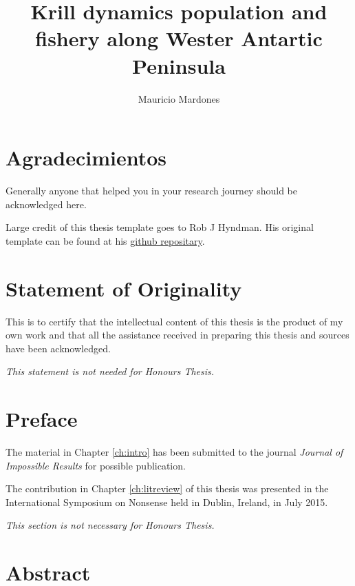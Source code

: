 \documentclass{sydneythesis}
\author{Mauricio Mardones}
\title{Krill dynamics population and fishery along Wester Antartic Peninsula}
\begin{document}

\titlepage

{\sf\tighttoc\doublespacing}

\hypertarget{agradecimientos}{%
\chapter*{Agradecimientos}\label{agradecimientos}}

Generally anyone that helped you in your research journey should be acknowledged here.

Large credit of this thesis template goes to Rob J Hyndman. His original template can be found at his \href{https://github.com/robjhyndman/MonashThesis}{github repositary}.

\hypertarget{statement-of-originality}{%
\chapter*{Statement of Originality}\label{statement-of-originality}}

This is to certify that the intellectual content of this thesis is the product of my own work and that all the assistance received in preparing this thesis and sources have been acknowledged.

\emph{This statement is not needed for Honours Thesis.}

\vspace*{2cm}\par\authorname

\hypertarget{preface}{%
\chapter*{Preface}\label{preface}}

The material in Chapter \ref{ch:intro} has been submitted to the journal \emph{Journal of Impossible Results} for possible publication.

The contribution in Chapter \ref{ch:litreview} of this thesis was presented in the International Symposium on Nonsense held in Dublin, Ireland, in July 2015.

\emph{This section is not necessary for Honours Thesis.}

\hypertarget{abstract}{%
\chapter*{Abstract}\label{abstract}}
\end{document}
